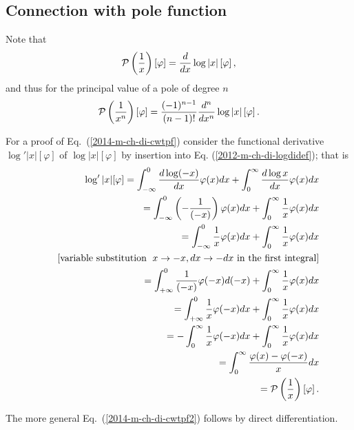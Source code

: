 \subsection{Connection with pole function}
Note that
\begin{equation}
 {\cal P} \left(\frac{1}{x}\right) \left[\varphi\right]  = \frac{d}{dx} \log \vert x \vert \left[\varphi\right]
,
\label{2014-m-ch-di-cwtpf}
\end{equation}
and thus
for the principal value of a pole of degree $n$
\begin{equation}
  {\cal P} \left(\frac{1}{x^n}\right) \left[\varphi\right]  =  \frac{(-1)^{n-1}}{(n-1)!}
\frac{d^n}{dx^n} \log \vert x \vert \left[\varphi\right]
.
\label{2014-m-ch-di-cwtpf2}
\end{equation}



{\color{OliveGreen}
\bproof

For a proof of Eq.~(\ref{2014-m-ch-di-cwtpf}) consider the functional derivative
$\log' \vert x\vert [\varphi ]$
of $\log \vert x\vert [\varphi ]$ by insertion into Eq. (\ref{2012-m-ch-di-logdidef}); that is
\begin{equation}
\begin{split}
\log' \vert x\vert [\varphi ]
=
\int_{-\infty}^0 \frac{d\log (-x)}{dx}   \varphi(x) dx
+
\int_{0}^\infty   \frac{d\log  x }{dx}    \varphi(x) dx
\\
\qquad
=
\int_{-\infty}^0 \left(-\frac{1}{(-x)}\right)   \varphi(x) dx
+
\int_{0}^\infty    \frac{1}{x}     \varphi(x) dx
\\
\qquad
=
\int_{-\infty}^0  \frac{1}{x}  \varphi(x) dx
+
\int_{0}^\infty    \frac{1}{x}     \varphi(x) dx
\\
\qquad
[\textrm{variable substitution }\; x\rightarrow -x, dx \rightarrow -dx \textrm{ in the first integral}]
\\
\qquad
=
\int_{+\infty}^0   \frac{1}{(-x)}     \varphi(-x) d(-x)
+
\int_{0}^\infty    \frac{1}{x}   \varphi(x) dx
\\
\qquad
=
\int_{+\infty}^0   \frac{1}{x}    \varphi(-x) dx
+
\int_{0}^\infty    \frac{1}{x}  \varphi(x) dx
\\
\qquad
=
-\int_0^{\infty}   \frac{1}{x}   \varphi(-x) dx
+
\int_{0}^\infty    \frac{1}{x}    \varphi(x) dx
\\
\qquad
=
\int_0^{\infty}   \frac{ \varphi(x) - \varphi(-x)}{x}  dx
\\
\qquad =
{\cal P} \left(\frac{1}{x}\right) \left[\varphi\right]
.
\end{split}
\end{equation}

The more general Eq.~(\ref{2014-m-ch-di-cwtpf2}) follows by direct differentiation.

\eproof
}


